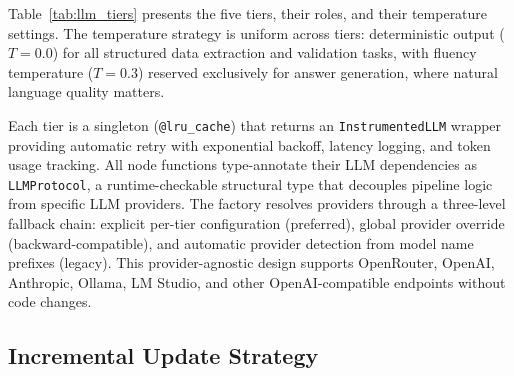 Table~\ref{tab:llm_tiers} presents the five tiers, their roles, and their temperature settings. The temperature strategy is uniform across tiers: deterministic output ($T=0.0$) for all structured data extraction and validation tasks, with fluency temperature ($T=0.3$) reserved exclusively for answer generation, where natural language quality matters.

\begin{table}[htbp]
\centering
\caption{LLM tier architecture: five tiers matched to task complexity.}
\label{tab:llm_tiers}
\end{table}

Each tier is a singleton (\texttt{@lru\_cache}) that returns an \texttt{InstrumentedLLM} wrapper providing automatic retry with exponential backoff, latency logging, and token usage tracking. All node functions type-annotate their LLM dependencies as \texttt{LLMProtocol}, a runtime-checkable structural type that decouples pipeline logic from specific LLM providers. The factory resolves providers through a three-level fallback chain: explicit per-tier configuration (preferred), global provider override (backward-compatible), and automatic provider detection from model name prefixes (legacy). This provider-agnostic design supports OpenRouter, OpenAI, Anthropic, Ollama, LM Studio, and other OpenAI-compatible endpoints without code changes.

\subsection{Incremental Update Strategy}
\label{sec:sd:incremental}


